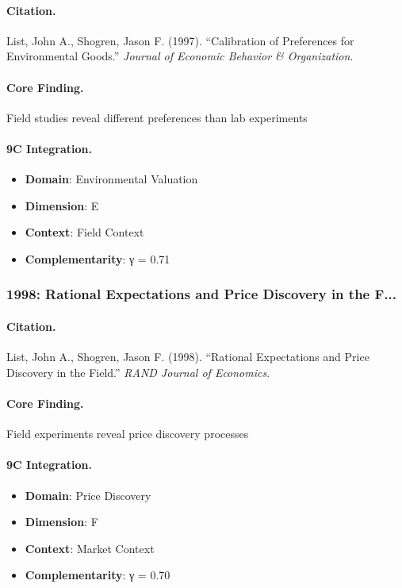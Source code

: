 \paragraph{Citation.}
List, John A., Shogren, Jason F. (1997). ``Calibration of Preferences for Environmental Goods.''
\textit{Journal of Economic Behavior & Organization}.

\paragraph{Core Finding.}
Field studies reveal different preferences than lab experiments

\paragraph{9C Integration.}
\begin{itemize}[nosep]
  \item \textbf{Domain}: Environmental Valuation
  \item \textbf{Dimension}: E
  \item \textbf{Context}: Field Context
  \item \textbf{Complementarity}: γ = 0.71
\end{itemize}


\subsubsection{1998: Rational Expectations and Price Discovery in the F...}

\paragraph{Citation.}
List, John A., Shogren, Jason F. (1998). ``Rational Expectations and Price Discovery in the Field.''
\textit{RAND Journal of Economics}.

\paragraph{Core Finding.}
Field experiments reveal price discovery processes

\paragraph{9C Integration.}
\begin{itemize}[nosep]
  \item \textbf{Domain}: Price Discovery
  \item \textbf{Dimension}: F
  \item \textbf{Context}: Market Context
  \item \textbf{Complementarity}: γ = 0.70
\end{itemize}


